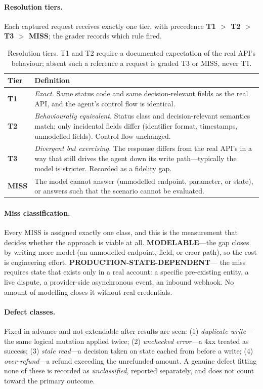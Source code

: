 \documentclass[11pt]{article}
\begin{document}
\paragraph{Resolution tiers.} Each captured request receives exactly one tier, with
precedence \textbf{T1 $>$ T2 $>$ T3 $>$ MISS}; the grader records which rule fired.

\begin{table}[h]
\centering
\small
\begin{tabular}{p{}p{}}
\toprule
Tier & Definition \\
\midrule
\textbf{T1} & \emph{Exact.} Same status code and same decision-relevant fields as the
real API, and the agent's control flow is identical. \\
\textbf{T2} & \emph{Behaviourally equivalent.} Status class and decision-relevant
semantics match; only incidental fields differ (identifier format, timestamps, unmodelled
fields). Control flow unchanged. \\
\textbf{T3} & \emph{Divergent but exercising.} The response differs from the real API's
in a way that still drives the agent down its write path---typically the model is
stricter. Recorded as a fidelity gap. \\
\textbf{MISS} & The model cannot answer (unmodelled endpoint, parameter, or state), or
answers such that the scenario cannot be evaluated. \\
\bottomrule
\end{tabular}
\caption{Resolution tiers. T1 and T2 require a documented expectation of the real API's
behaviour; absent such a reference a request is graded T3 or MISS, never T1.}
\label{tab:tiers}
\end{table}

\paragraph{Miss classification.} Every MISS is assigned exactly one class, and this is
the measurement that decides whether the approach is viable at all.
\textbf{MODELABLE}---the gap closes by writing more model (an unmodelled endpoint, field,
or error path), so the cost is engineering effort. \textbf{PRODUCTION-STATE-DEPENDENT}---%
the miss requires state that exists only in a real account: a specific pre-existing
entity, a live dispute, a provider-side asynchronous event, an inbound webhook. No amount
of modelling closes it without real credentials.

\paragraph{Defect classes.} Fixed in advance and not extendable after results are seen:
(1) \emph{duplicate write}---the same logical mutation applied twice; (2) \emph{unchecked
error}---a 4xx treated as success; (3) \emph{stale read}---a decision taken on state
cached from before a write; (4) \emph{over-refund}---a refund exceeding the unrefunded
amount. A genuine defect fitting none of these is recorded as \emph{unclassified},
reported separately, and does not count toward the primary outcome.
\end{document}
